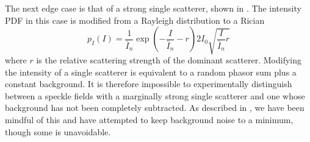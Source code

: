 The next edge case is that of a strong single scatterer, shown in 
.  The intensity PDF in this case is modified
from a Rayleigh distribution to a Rician~\cite{goodman2007speckle} 
\begin{equation}
p_I(I) = \frac{1}{\bar{I}_n} \exp\left(-\frac{I}{\bar{I}_n} - r\right) 2 I_0
\sqrt{\frac{I}{\bar{I}_n} r}
\label{ricedpf}
\end{equation}
where $r$ is the relative scattering strength of the dominant scatterer.
Modifying the intensity of a single scatterer is equivalent to a random phasor
sum plus a constant background.  It is therefore impossible to experimentally
distinguish between a speckle fields with a marginally strong single scatterer
and one whose background has not been completely subtracted.  As described in
, we have been mindful of this and have attempted to
keep background noise to a minimum, though some is unavoidable.
